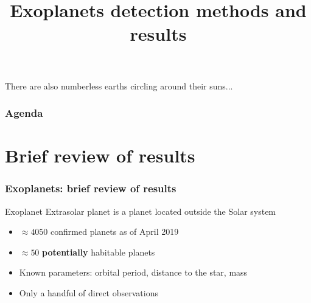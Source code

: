 \documentclass[aspectratio=169]{beamer}
\title[Exoplanets detection methods and results]{Exoplanets detection methods and results}
\author{}
\date{}
\begin{document}
{
\begin{frame}[plain]
\vspace{-5cm}
\small{
\centerline{There are also numberless earths circling around their suns...}
}
\end{frame}
}

\begin{frame}
\frametitle{Agenda}
\tableofcontents
\end{frame}

\section{Brief review of results}
\begin{frame}
\frametitle{Exoplanets: brief review of results}
\begin{block}{Exoplanet}
Extrasolar planet is a planet located outside the Solar system
\end{block}
\begin{itemize}
\item $\approx 4050$ confirmed planets as of April 2019 \cite{exoplanet.eu}
\item $\approx 50$ {\bf potentially} habitable planets
\item Known parameters: orbital period, distance to the star, mass
\item Only a handful of direct observations
\end{itemize}
\end{frame}
\end{document}
